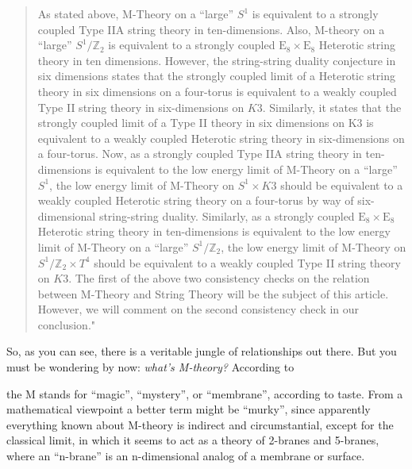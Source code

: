 \documentclass{article}
\def\tightlist{}
\renewcommand{\texttt}[1]{%
  \begingroup
  \ttfamily
  \begingroup\lccode`~=`/\lowercase{\endgroup\def~}{/\discretionary{}{}{}}%
  \begingroup\lccode`~=`[\lowercase{\endgroup\def~}{[\discretionary{}{}{}}%
  \begingroup\lccode`~=`.\lowercase{\endgroup\def~}{.\discretionary{}{}{}}%
  \catcode`/=\active\catcode`[=\active\catcode`.=\active
  \scantokens{#1\noexpand}%
  \endgroup
}
\begin{document}
\begin{quote}
As stated above, M-Theory on a ``large'' \(S^1\) is equivalent to a
strongly coupled Type IIA string theory in ten-dimensions. Also,
M-theory on a ``large'' \(S^1/\mathbb{Z}_2\) is equivalent to a strongly
coupled \(\mathrm{E}_8 \times \mathrm{E}_8\) Heterotic string theory in
ten dimensions. However, the string-string duality conjecture in six
dimensions states that the strongly coupled limit of a Heterotic string
theory in six dimensions on a four-torus is equivalent to a weakly
coupled Type II string theory in six-dimensions on \(K3\). Similarly, it
states that the strongly coupled limit of a Type II theory in six
dimensions on K3 is equivalent to a weakly coupled Heterotic string
theory in six-dimensions on a four-torus. Now, as a strongly coupled
Type IIA string theory in ten-dimensions is equivalent to the low energy
limit of M-Theory on a ``large'' \(S^1\), the low energy limit of
M-Theory on \(S^1 \times K3\) should be equivalent to a weakly coupled
Heterotic string theory on a four-torus by way of six-dimensional
string-string duality. Similarly, as a strongly coupled
\(\mathrm{E}_8 \times \mathrm{E}_8\) Heterotic string theory in
ten-dimensions is equivalent to the low energy limit of M-Theory on a
``large'' \(S^1/\mathbb{Z}_2\), the low energy limit of M-Theory on
\(S^1/\mathbb{Z}_2 \times T^4\) should be equivalent to a weakly coupled
Type II string theory on \(K3\). The first of the above two consistency
checks on the relation between M-Theory and String Theory will be the
subject of this article. However, we will comment on the second
consistency check in our conclusion."
\end{quote}

So, as you can see, there is a veritable jungle of relationships out
there. But you must be wondering by now: \emph{what's M-theory?}
According to


the M stands for ``magic'', ``mystery'', or ``membrane'', according to
taste. From a mathematical viewpoint a better term might be ``murky'',
since apparently everything known about M-theory is indirect and
circumstantial, except for the classical limit, in which it seems to act
as a theory of 2-branes and 5-branes, where an ``n-brane'' is an
n-dimensional analog of a membrane or surface.
\end{document}
